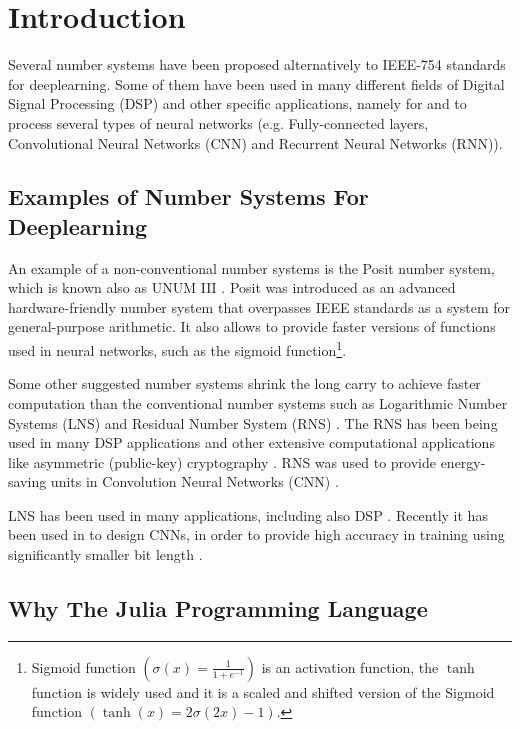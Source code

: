 \section{Introduction}

Several number systems have been proposed alternatively to IEEE-754 standards \cite{754} for deeplearning. Some of them have been used in many different fields of Digital Signal Processing (DSP) and other specific applications, namely for and to process several types of neural networks (e.g. Fully-connected layers, Convolutional Neural Networks (CNN) and Recurrent Neural Networks (RNN)).

\subsection{Examples of Number Systems For Deeplearning}

An example of a non-conventional number systems is the Posit number system, which is known also as UNUM III \cite{Gustafson2017}. Posit was introduced as an advanced hardware-friendly number system that overpasses IEEE standards as a system for general-purpose arithmetic. It also allows to provide faster versions of functions used in neural networks, such as the sigmoid function\footnote{Sigmoid function $\left(\sigma(x) = \frac{1}{1 + e^{-1}}\right)$ is an activation function, the $\tanh$ function is widely used and it is a scaled and shifted version of the Sigmoid function $\left(\tanh(x) = 2 \sigma(2x) -1\right)$.}.

Some other suggested number systems shrink the long carry to achieve faster computation than the conventional number systems such as Logarithmic Number Systems (LNS) \cite{Kingsbury1971} and Residual Number System (RNS) \cite{Garner1959}. The RNS has been being used in many DSP applications \cite{Cardarilli2007,Chaves2003,Claudio1995,DiClaudio1990,Jullien1987} and other extensive computational applications like asymmetric (public-key) cryptography \cite{Sousa2016}. RNS was used to provide energy-saving units in Convolution Neural Networks (CNN) \cite{Samimi2020}.

LNS \cite{Kingsbury1971,Alexopoulos1975,Lee1977} has been used in many applications, including also DSP \cite{Dimitrov2001,Lewis1995}. Recently it has been used in to design CNNs, in order to provide high accuracy in training using significantly smaller bit length \cite{Miyashita2016,Juang2019}.

\subsection{Why The Julia Programming Language}

